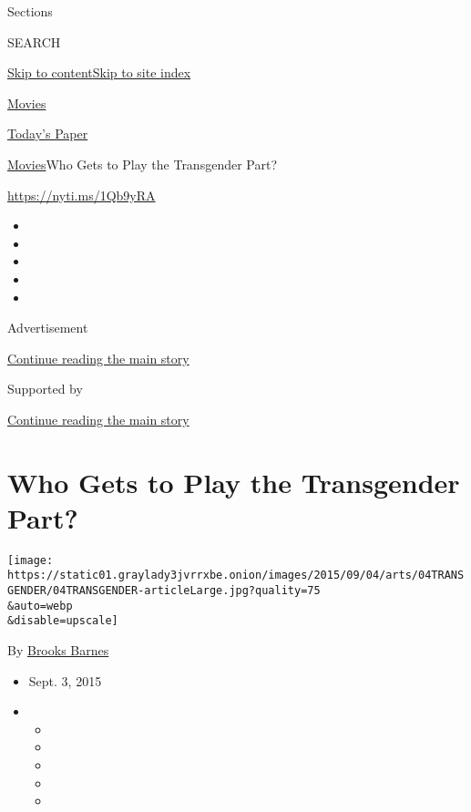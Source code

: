Sections

SEARCH

\protect\hyperlink{site-content}{Skip to
content}\protect\hyperlink{site-index}{Skip to site index}

\href{https://www.nytimes3xbfgragh.onion/section/movies}{Movies}

\href{https://myaccount.nytimes3xbfgragh.onion/auth/login?response_type=cookie\&client_id=vi}{}

\href{https://www.nytimes3xbfgragh.onion/section/todayspaper}{Today's
Paper}

\href{/section/movies}{Movies}\textbar{}Who Gets to Play the Transgender
Part?

\url{https://nyti.ms/1Qb9yRA}

\begin{itemize}
\item
\item
\item
\item
\item
\end{itemize}

Advertisement

\protect\hyperlink{after-top}{Continue reading the main story}

Supported by

\protect\hyperlink{after-sponsor}{Continue reading the main story}

\hypertarget{who-gets-to-play-the-transgender-part}{%
\section{Who Gets to Play the Transgender
Part?}\label{who-gets-to-play-the-transgender-part}}

\texttt{[image: https://static01.graylady3jvrrxbe.onion/images/2015/09/04/arts/04TRANSGENDER/04TRANSGENDER-articleLarge.jpg?quality=75\\\&auto=webp\\\&disable=upscale]}

By \href{http://www.nytimes3xbfgragh.onion/by/brooks-barnes}{Brooks
Barnes}

\begin{itemize}
\item
  Sept. 3, 2015
\item
  \begin{itemize}
  \item
  \item
  \item
  \item
  \item
  \end{itemize}
\end{itemize}


